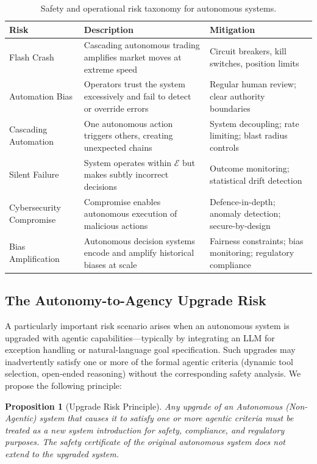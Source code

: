 \documentclass[12pt, a4paper]{article}
\newtheorem{proposition}{Proposition}
\begin{document}
\begin{table}[ht]
\centering
\caption{Safety and operational risk taxonomy for autonomous systems.}
\label{tab:risks}
\begin{tabular}{p{3cm}p{5cm}p{4.5cm}}
\toprule
\textbf{Risk} & \textbf{Description} & \textbf{Mitigation} \\
\midrule
Flash Crash & Cascading autonomous trading amplifies market moves at extreme speed & Circuit breakers, kill switches, position limits \\
Automation Bias & Operators trust the system excessively and fail to detect or override errors & Regular human review; clear authority boundaries \\
Cascading Automation & One autonomous action triggers others, creating unexpected chains & System decoupling; rate limiting; blast radius controls \\
Silent Failure & System operates within $\mathcal{E}$ but makes subtly incorrect decisions & Outcome monitoring; statistical drift detection \\
Cybersecurity Compromise & Compromise enables autonomous execution of malicious actions & Defence-in-depth; anomaly detection; secure-by-design \\
Bias Amplification & Autonomous decision systems encode and amplify historical biases at scale & Fairness constraints; bias monitoring; regulatory compliance \\
\bottomrule
\end{tabular}
\end{table}

\subsection{The Autonomy-to-Agency Upgrade Risk}
A particularly important risk scenario arises when an autonomous system is upgraded with agentic capabilities---typically by integrating an LLM for exception handling or natural-language goal specification. Such upgrades may inadvertently satisfy one or more of the formal agentic criteria (dynamic tool selection, open-ended reasoning) without the corresponding safety analysis. We propose the following principle:

\begin{proposition}[Upgrade Risk Principle]
Any upgrade of an Autonomous (Non-Agentic) system that causes it to satisfy one or more agentic criteria must be treated as a new system introduction for safety, compliance, and regulatory purposes. The safety certificate of the original autonomous system does not extend to the upgraded system.
\end{proposition}
\end{document}
